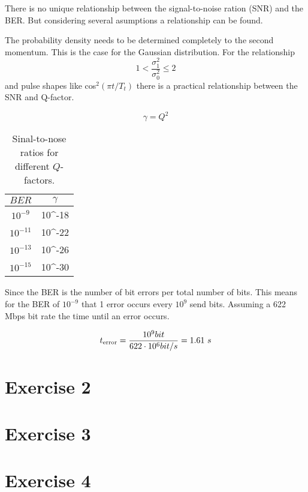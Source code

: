 There is no unique relationship between the signal-to-noise ration (SNR) and the BER. But considering several asumptions a relationship can be found. 

The probability density needs to be determined completely to the second momentum. This is the case for the Gaussian distribution. For the relationship 
\begin{equation}
1 < \frac{\sigma_1^2}{\sigma_0^2}\leq 2
\label{eq:}
\end{equation}
and pulse shapes like cos$^2(\pi t/T_t)$ there is a practical relationship between the SNR and Q-factor.

\begin{equation}
\gamma = Q^2
\label{eq:}
\end{equation}

\begin{table}[h]%
\centering
\caption{Sinal-to-nose ratios for different $Q$-factors.}
 
\begin{tabular}{cc}

\toprule

$BER$	& $\gamma$\\
\midrule
$10^{-9}$ &10^{-18} \\
$10^{-11}$ &10^{-22} \\
$10^{-13}$ &10^{-26} \\
$10^{-15}$ &10^{-30} \\
\bottomrule 
\end{tabular}
\label{tab:1_daempfung}
\end{table}

Since the BER is the number of bit errors per total number of bits. 
This means for the BER of $10^{-9}$ that 1 error occurs every $10^{9}$ send bits. Assuming a 622 Mbps bit rate the time until an error occurs.

\begin{equation}
t_{\mathrm{error}}=\frac{10^9 bit}{622\cdot10^{6} bit/s} = 1.61~s
\label{eq:}
\end{equation}


\section{Exercise 2}




\section{Exercise 3}



\section{Exercise 4}